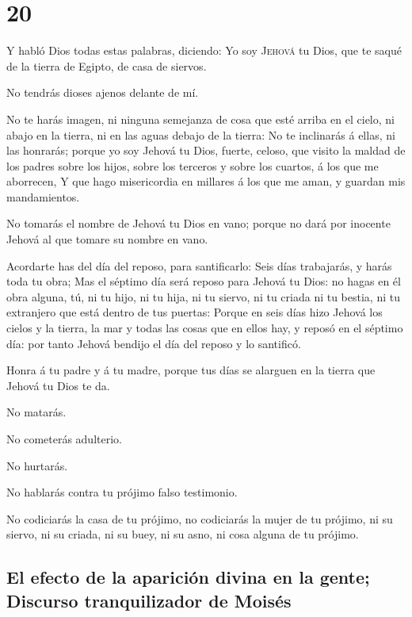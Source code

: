 \hypertarget{section-19}{%
\section{20}\label{section-19}}

 Y habló Dios todas estas palabras, diciendo:
 Yo soy \textsc{Jehová} tu Dios, que te saqué de la tierra
de Egipto, de casa de siervos.

 No tendrás dioses ajenos delante de mí.

 No te harás imagen, ni ninguna semejanza de cosa que esté
arriba en el cielo, ni abajo en la tierra, ni en las aguas debajo de la
tierra:  No te inclinarás á ellas, ni las honrarás; porque
yo soy Jehová tu Dios, fuerte, celoso, que visito la maldad de los
padres sobre los hijos, sobre los terceros y sobre los cuartos, á los
que me aborrecen,  Y que hago misericordia en millares á
los que me aman, y guardan mis mandamientos.

 No tomarás el nombre de Jehová tu Dios en vano; porque no
dará por inocente Jehová al que tomare su nombre en vano.

 Acordarte has del día del reposo, para santificarlo:
 Seis días trabajarás, y harás toda tu obra;
 Mas el séptimo día será reposo para Jehová tu Dios: no
hagas en él obra alguna, tú, ni tu hijo, ni tu hija, ni tu siervo, ni tu
criada ni tu bestia, ni tu extranjero que está dentro de tus puertas:
 Porque en seis días hizo Jehová los cielos y la tierra,
la mar y todas las cosas que en ellos hay, y reposó en el séptimo día:
por tanto Jehová bendijo el día del reposo y lo santificó.

 Honra á tu padre y á tu madre, porque tus días se
alarguen en la tierra que Jehová tu Dios te da.

 No matarás.

 No cometerás adulterio.

 No hurtarás.

 No hablarás contra tu prójimo falso testimonio.

 No codiciarás la casa de tu prójimo, no codiciarás la
mujer de tu prójimo, ni su siervo, ni su criada, ni su buey, ni su asno,
ni cosa alguna de tu prójimo.

\hypertarget{el-efecto-de-la-apariciuxf3n-divina-en-la-gente-discurso-tranquilizador-de-moisuxe9s}{%
\subsection{El efecto de la aparición divina en la gente; Discurso
tranquilizador de
Moisés}\label{el-efecto-de-la-apariciuxf3n-divina-en-la-gente-discurso-tranquilizador-de-moisuxe9s}}

